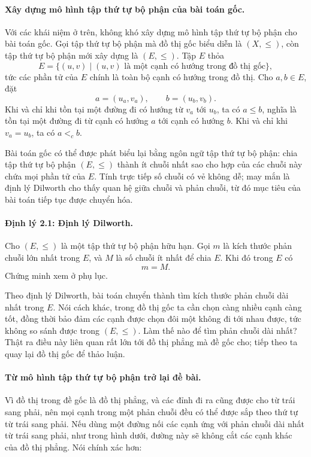 \documentclass[11pt]{article}
\begin{document}
\paragraph{Xây dựng mô hình tập thứ tự bộ phận của bài toán gốc.}
Với các khái niệm ở trên, không khó xây dựng mô hình tập thứ tự bộ phận cho bài
toán gốc. Gọi tập thứ tự bộ phận mà đồ thị gốc biểu diễn là \((X,\le)\), còn
tập thứ tự bộ phận mới xây dựng là \((E,\le)\). Tập \(E\) thỏa
\[
  E=\{(u,v)\mid (u,v)\text{ là một cạnh có hướng trong đồ thị gốc}\},
\]
tức các phần tử của \(E\) chính là toàn bộ cạnh có hướng trong đồ thị. Cho
\(a,b\in E\), đặt
\[
  a=(u_a,v_a),\qquad b=(u_b,v_b).
\]
Khi và chỉ khi tồn tại một đường đi có hướng từ \(v_a\) tới \(u_b\), ta có
\(a\le b\), nghĩa là tồn tại một đường đi từ cạnh có hướng \(a\) tới cạnh có
hướng \(b\). Khi và chỉ khi \(v_a=u_b\), ta có \(a<_c b\).

Bài toán gốc có thể được phát biểu lại bằng ngôn ngữ tập thứ tự bộ phận: chia
tập thứ tự bộ phận \((E,\le)\) thành ít chuỗi nhất sao cho hợp của các chuỗi
này chứa mọi phần tử của \(E\). Tính trực tiếp số chuỗi có vẻ không dễ; may mắn
là định lý Dilworth cho thấy quan hệ giữa chuỗi và phản chuỗi, từ đó mục tiêu
của bài toán tiếp tục được chuyển hóa.

\paragraph{Định lý 2.1: Định lý Dilworth.}
Cho \((E,\le)\) là một tập thứ tự bộ phận hữu hạn. Gọi \(m\) là kích thước
phản chuỗi lớn nhất trong \(E\), và \(M\) là số chuỗi ít nhất để chia \(E\).
Khi đó trong \(E\) có
\[
  m=M.
\]
Chứng minh xem ở phụ lục.

Theo định lý Dilworth, bài toán chuyển thành tìm kích thước phản chuỗi dài nhất
trong \(E\). Nói cách khác, trong đồ thị gốc ta cần chọn càng nhiều cạnh càng
tốt, đồng thời bảo đảm các cạnh được chọn đôi một không đi tới nhau được, tức
không so sánh được trong \((E,\le)\). Làm thế nào để tìm phản chuỗi dài nhất?
Thật ra điều này liên quan rất lớn tới đồ thị phẳng mà đề gốc cho; tiếp theo
ta quay lại đồ thị gốc để thảo luận.

\paragraph{Từ mô hình tập thứ tự bộ phận trở lại đề bài.}
Vì đồ thị trong đề gốc là đồ thị phẳng, và các đỉnh đi ra cũng được cho từ
trái sang phải, nên mọi cạnh trong một phản chuỗi đều có thể được sắp theo thứ
tự từ trái sang phải. Nếu dùng một đường nối các cạnh ứng với phản chuỗi dài
nhất từ trái sang phải, như trong hình dưới, đường này sẽ không cắt các cạnh
khác của đồ thị phẳng. Nói chính xác hơn:
\end{document}
